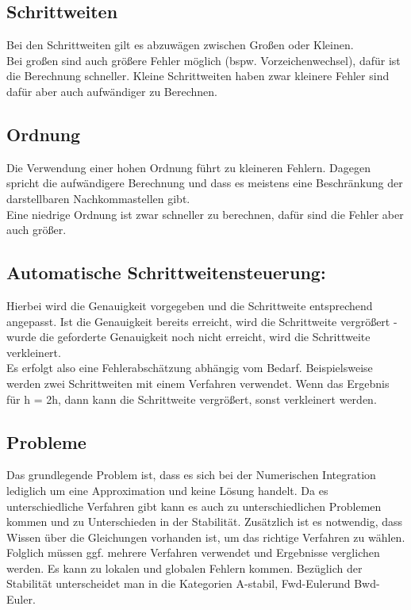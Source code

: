 \documentclass[11pt, fleqn, a4paper, leqno]{scrartcl} %
\begin{document}
		\subsection{Schrittweiten}
			Bei den Schrittweiten gilt es abzuwägen zwischen Großen oder Kleinen.\\
			Bei großen sind auch größere Fehler möglich (bspw. Vorzeichenwechsel), dafür ist die Berechnung schneller. Kleine Schrittweiten haben zwar kleinere Fehler sind dafür aber auch aufwändiger zu Berechnen.\\
		\subsection{Ordnung}
			Die Verwendung einer hohen Ordnung führt zu kleineren Fehlern. Dagegen spricht die aufwändigere Berechnung und dass es meistens eine Beschränkung der darstellbaren Nachkommastellen gibt.\\
			Eine niedrige Ordnung ist zwar schneller zu berechnen, dafür sind die Fehler aber auch größer.
		\subsection{Automatische Schrittweitensteuerung:}
			Hierbei wird die Genauigkeit vorgegeben und die Schrittweite entsprechend angepasst. Ist die Genauigkeit bereits erreicht, wird die Schrittweite vergrößert - wurde die geforderte Genauigkeit noch nicht erreicht, wird die Schrittweite verkleinert.\\
			Es erfolgt also eine Fehlerabschätzung abhängig vom Bedarf. Beispielsweise werden zwei Schrittweiten mit einem Verfahren verwendet. Wenn das Ergebnis für h = 2h, dann kann die Schrittweite vergrößert, sonst verkleinert werden.
		\subsection{Probleme}
			Das grundlegende Problem ist, dass es sich bei der Numerischen Integration lediglich um eine Approximation und keine Lösung handelt. Da es unterschiedliche Verfahren gibt kann es auch zu unterschiedlichen Problemen kommen und zu Unterschieden in der Stabilität. Zusätzlich ist es notwendig, dass Wissen über die Gleichungen vorhanden ist, um das richtige Verfahren zu wählen.\\
			Folglich müssen ggf. mehrere Verfahren verwendet und Ergebnisse verglichen werden. Es kann zu lokalen und globalen Fehlern kommen. Bezüglich der Stabilität unterscheidet man in die Kategorien \glqq A-stabil\grqq, \glqq Fwd-Euler\grqq und \glqq Bwd-Euler\grqq.
	
\end{document}
